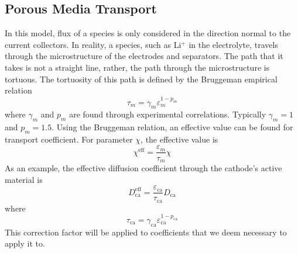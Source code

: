 \documentclass[12pt]{article}
\begin{document}
	\subsection{Porous Media Transport}
	In this model, flux of a species is only considered in the direction normal to the current collectors. In reality, a species, such as Li$^+$ in the electrolyte, travels through the microstructure of the electrodes and separators. The path that it takes is not a straight line, rather, the path through the microstructure is tortuous. The tortuosity of this path is defined by the Bruggeman empirical relation
	\begin{equation}
		\tau_m = \gamma_m \varepsilon_m^{1-p_m}
	\end{equation}
	where $\gamma_m$ and $p_m$ are found through experimental correlations. Typically $\gamma_m = 1$ and $p_m = 1.5$. Using the Bruggeman relation, an effective value can be found for transport coefficient. For parameter $\chi$, the effective value is 
	\begin{equation}
		\chi^{\text{eff}} = \frac{\varepsilon_m}{\tau_m}\chi
	\end{equation}
	As an example, the effective diffusion coefficient through the cathode's active material is
	\begin{equation}
		D_{\text{ca}}^{\text{eff}} = \frac{\varepsilon_\text{ca}}{\tau_\text{ca}}D_{\text{ca}}
	\end{equation}
	where
	\begin{equation}
		\tau_\text{ca} = \gamma_\text{ca} \varepsilon_\text{ca}^{1-p_\text{ca}}
	\end{equation}
	This correction factor will be applied to coefficients that we deem necessary to apply it to.
\end{document}
